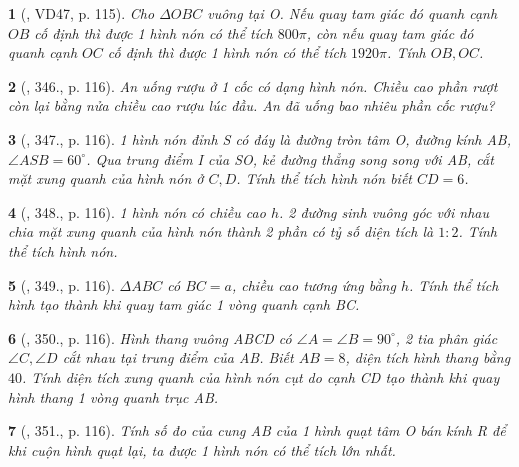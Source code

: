 \documentclass{article}
\newtheorem{baitoan}{}
\begin{document}
\begin{baitoan}[\cite{Binh_Toan_9_tap_2}, VD47, p. 115]
	Cho $\Delta OBC$ vuông tại O. Nếu quay tam giác đó quanh cạnh $OB$ cố định thì được 1 hình nón có thể tích $800\pi$, còn nếu quay tam giác đó quanh cạnh $OC$ cố định thì được 1 hình nón có thể tích $1920\pi$. Tính $OB,OC$.
\end{baitoan}

\begin{baitoan}[\cite{Binh_Toan_9_tap_2}, 346., p. 116]
	An uống rượu ở 1 cốc có dạng hình nón. Chiều cao phần rượt còn lại bằng nửa chiều cao rượu lúc đầu. An đã uống bao nhiêu phần cốc rượu?
\end{baitoan}

\begin{baitoan}[\cite{Binh_Toan_9_tap_2}, 347., p. 116]
	1 hình nón đỉnh S có đáy là đường tròn tâm O, đường kính AB, $\angle ASB = 60^\circ$. Qua trung điểm I của SO, kẻ đường thẳng song song với AB, cắt mặt xung quanh của hình nón ở $C,D$. Tính thể tích hình nón biết $CD = 6$.
\end{baitoan}

\begin{baitoan}[\cite{Binh_Toan_9_tap_2}, 348., p. 116]
	1 hình nón có chiều cao $h$. 2 đường sinh vuông góc với nhau chia mặt xung quanh của hình nón thành 2 phần có tỷ số diện tích là $1:2$. Tính thể tích hình nón.
\end{baitoan}

\begin{baitoan}[\cite{Binh_Toan_9_tap_2}, 349., p. 116]
	$\Delta ABC$ có $BC = a$, chiều cao tương ứng bằng $h$. Tính thể tích hình tạo thành khi quay tam giác 1 vòng quanh cạnh BC.
\end{baitoan}

\begin{baitoan}[\cite{Binh_Toan_9_tap_2}, 350., p. 116]
	Hình thang vuông ABCD có $\angle A = \angle B = 90^\circ$, 2 tia phân giác $\angle C,\angle D$ cắt nhau tại trung điểm của AB. Biết $AB = 8$, diện tích hình thang bằng $40$. Tính diện tích xung quanh của hình nón cụt do cạnh CD tạo thành khi quay hình thang 1 vòng quanh trục AB.
\end{baitoan}

\begin{baitoan}[\cite{Binh_Toan_9_tap_2}, 351., p. 116]
	Tính số đo của cung AB của 1 hình quạt tâm O bán kính R để khi cuộn hình quạt lại, ta được 1 hình nón có thể tích lớn nhất.
\end{baitoan}
\end{document}
